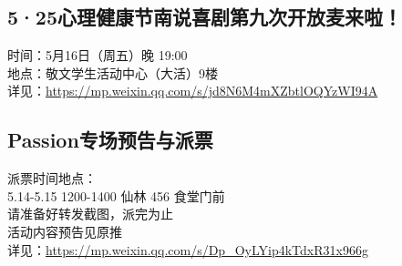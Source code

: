 \documentclass[letterpaper, 12pt]{article}
\begin{document}
\begin{multicols}{2}
\subsection{5·25心理健康节南说喜剧第九次开放麦来啦！} %
时间：5月16日（周五）晚 19:00
\\地点：敬文学生活动中心（大活）9楼
\\详见：\url{https://mp.weixin.qq.com/s/jd8N6M4mXZbtlOQYzWI94A}
\subsection{Passion专场预告与派票} %
派票时间地点：
\\5.14-5.15 1200-1400 仙林 456 食堂门前
\\请准备好转发截图，派完为止
\\活动内容预告见原推
\\详见：\url{https://mp.weixin.qq.com/s/Dp_OyLYip4kTdxR31x966g}
\end{multicols}
\end{document}
